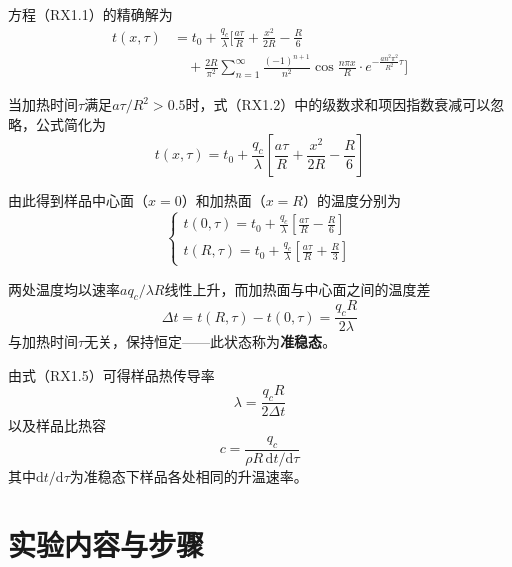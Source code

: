 \documentclass[a4paper,8pt,twocolumn]{article}
\begin{document}
方程（RX1.1）的精确解为
\begin{equation}
  \begin{split}
    t(x,\tau) &= t_0 + \frac{q_c}{\lambda}
    \Bigg[\frac{a\tau}{R}+\frac{x^2}{2R}-\frac{R}{6}\\
    &\quad +\frac{2R}{\pi^2}\sum_{n=1}^{\infty}
      \frac{(-1)^{n+1}}{n^2}\cos\!\frac{n\pi x}{R}
      \cdot e^{-\frac{an^2\pi^2}{R^2}\tau}\Bigg]
  \end{split}
  \tag{RX1.2}
\end{equation}

当加热时间$\tau$满足$a\tau/R^2>0.5$时，式（RX1.2）中的级数求和项因指数衰减可以忽略，公式简化为
\begin{equation}
  t(x,\tau)=t_0+\frac{q_c}{\lambda}
  \!\left[\frac{a\tau}{R}+\frac{x^2}{2R}-\frac{R}{6}\right]
  \tag{RX1.3}
\end{equation}

由此得到样品中心面（$x=0$）和加热面（$x=R$）的温度分别为
\begin{equation}
  \begin{cases}
    \displaystyle t(0,\tau)=t_0+\frac{q_c}{\lambda}
      \!\left[\frac{a\tau}{R}-\frac{R}{6}\right]\\[8pt]
    \displaystyle t(R,\tau)=t_0+\frac{q_c}{\lambda}
      \!\left[\frac{a\tau}{R}+\frac{R}{3}\right]
  \end{cases}
  \tag{RX1.4}
\end{equation}

两处温度均以速率$aq_c/\lambda R$线性上升，而加热面与中心面之间的温度差
\begin{equation}
  \Delta t = t(R,\tau)-t(0,\tau)=\frac{q_c R}{2\lambda}
  \tag{RX1.5}
\end{equation}
与加热时间$\tau$无关，保持恒定——此状态称为\textbf{准稳态}。

由式（RX1.5）可得样品热传导率
\begin{equation}
  \lambda=\frac{q_c R}{2\Delta t}
  \tag{RX1.6}
\end{equation}
以及样品比热容
\begin{equation}
  c=\frac{q_c}{\rho R\,\mathrm{d}t/\mathrm{d}\tau}
  \tag{RX1.7}
\end{equation}
其中$\mathrm{d}t/\mathrm{d}\tau$为准稳态下样品各处相同的升温速率。

\section{实验内容与步骤}
\end{document}
